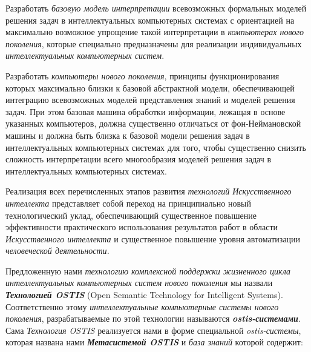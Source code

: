 \begin{textitemize}
	\item Разработать \textit{базовую модель интерпретации} всевозможных формальных моделей решения задач в интеллектуальных компьютерных системах с ориентацией на максимально возможное упрощение такой интерпретации в \textit{компьютерах нового поколения}, которые специально предназначены для реализации индивидуальных \textit{интеллектуальных компьютерных систем}.
	\item Разработать \textit{компьютеры нового поколения}, принципы функционирования которых максимально близки к базовой абстрактной модели, обеспечивающей интеграцию всевозможных моделей представления знаний и моделей решения задач. При этом базовая машина обработки информации, лежащая в основе указанных компьютеров, должна существенно отличаться от фон-Неймановской машины и должна быть близка к базовой модели решения задач в интеллектуальных компьютерных системах для того, чтобы существенно снизить сложность интерпретации всего многообразия моделей решения задач в интеллектуальных компьютерных системах.
	
\end{textitemize}

Реализация всех перечисленных этапов развития \textit{технологий Искусственного интеллекта} представляет собой переход на принципиально новый технологический уклад, обеспечивающий существенное повышение эффективности практического использования результатов работ в области \textit{Искусственного интеллекта} и существенное повышение уровня автоматизации \textit{человеческой деятельности.}

Предложенную нами \textit{технологию комплексной поддержки жизненного цикла интеллектуальных компьютерных систем нового поколения} мы назвали \textbf{\textit{Технологией OSTIS}} (Open Semantic Technology for Intelligent Systems). Соответственно этому \textit{интеллектуальные компьютерные системы нового поколения}, разрабатываемые по этой технологии называются \textbf{\textit{ostis-системами}}. Сама \textit{Технология OSTIS} реализуется нами в форме специальной \textit{ostis-системы}, которая названа нами \textbf{\textit{Метасистемой OSTIS}} и \textit{база знаний} которой содержит:

